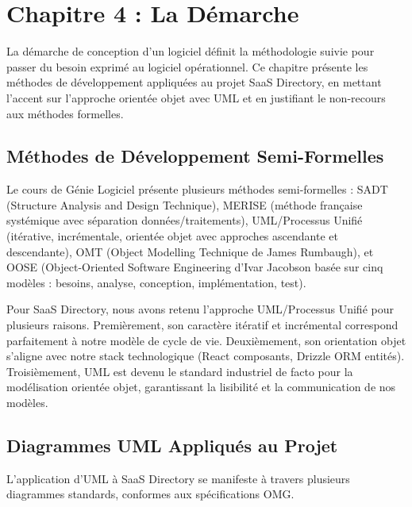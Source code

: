 
\section{Chapitre 4 : La Démarche}



La démarche de conception d'un logiciel définit la méthodologie suivie pour passer du besoin exprimé au logiciel opérationnel. Ce chapitre présente les méthodes de développement appliquées au projet SaaS Directory, en mettant l'accent sur l'approche orientée objet avec UML et en justifiant le non-recours aux méthodes formelles.



\subsection{Méthodes de Développement Semi-Formelles}



Le cours de Génie Logiciel présente plusieurs méthodes semi-formelles : SADT (Structure Analysis and Design Technique), MERISE (méthode française systémique avec séparation données/traitements), UML/Processus Unifié (itérative, incrémentale, orientée objet avec approches ascendante et descendante), OMT (Object Modelling Technique de James Rumbaugh), et OOSE (Object-Oriented Software Engineering d'Ivar Jacobson basée sur cinq modèles : besoins, analyse, conception, implémentation, test).



Pour SaaS Directory, nous avons retenu l'approche UML/Processus Unifié pour plusieurs raisons. Premièrement, son caractère itératif et incrémental correspond parfaitement à notre modèle de cycle de vie. Deuxièmement, son orientation objet s'aligne avec notre stack technologique (React composants, Drizzle ORM entités). Troisièmement, UML est devenu le standard industriel de facto pour la modélisation orientée objet, garantissant la lisibilité et la communication de nos modèles.



\subsection{Diagrammes UML Appliqués au Projet}



L'application d'UML à SaaS Directory se manifeste à travers plusieurs diagrammes standards, conformes aux spécifications OMG.



